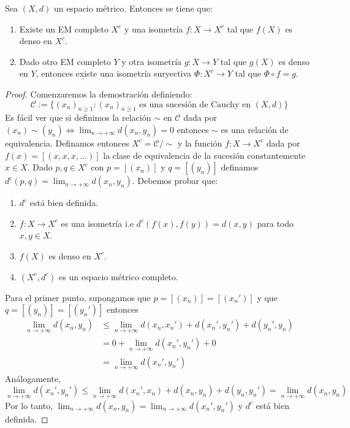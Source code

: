 \documentclass{article}
\theoremstyle{plain}
\theoremstyle{definition}
\newenvironment{ejercicio}[1]{\begin{trivlist}
\item[\hskip \labelsep {\bfseries Ejercicio}\hskip \labelsep {\bfseries #1.}]}{\end{trivlist}}
\begin{document}
\begin{ejercicio}{8}
    Sea \( (X, d) \) un espacio métrico. Entonces se tiene que:
    \begin{enumerate}
        \item Existe un EM completo \( X^c \) y una isometría \( f : X \to X^c \) tal que \( f(X) \) es denso en \( X^c \).
        \item Dado otro EM completo \( Y \) y otra isometría \( g : X \to Y \) tal que \( g(X) \) es denso en \( Y \), entonces existe una isometría suryectiva \( \Phi : X^c \to Y \) tal que \( \Phi \circ f = g \).
    \end{enumerate}
\end{ejercicio}
\begin{proof}
    Comenzaremos la demostración definiendo: \[
        \mathcal{C} := \{ {(x_n)}_{n \geq 1} : {(x_n)}_{n \geq 1} \text{ es una sucesión de Cauchy en } (X, d) \}
    \]
    Es fácil ver que si definimos la relación \( \sim \) en \( \mathcal{C} \) dada por \( {(x_n)} \sim {(y_n)} \iff \lim_{n \to +\infty} d(x_n, y_n) = 0 \) entonces \( \sim \) es una relación de equivalencia.
    Definamos entonces \( X^c = \mathcal{C} / \sim \) y la función \( f : X \to X^c \) dada por \( f(x) = [(x, x, x, \ldots)] \) la clase de equivalencia de la sucesión constantemente \( x \in X \).
    Dado \( p, q \in X^c \) con \( p = [(x_n)] \) y \( q = [(y_n)] \) definamos \( d^c(p, q) = \lim_{n \to +\infty} d(x_n, y_n) \). Debemos probar que: \begin{enumerate}
        \item \( d^c \) está bien definida.
        \item \( f : X \to X^c \) es una isometría i.e \( d^c(f(x), f(y)) = d(x, y) \) para todo \( x, y \in X \).
        \item \( f(X) \) es denso en \( X^c \).
        \item \( (X^c, d^c) \) es un espacio métrico completo.
    \end{enumerate}
    Para el primer punto, supongamos que \( p = [(x_n)] = [(x_n')] \) y que \( q = [(y_n)] = [(y_n')] \) entonces \begin{align*}
        \lim_{n \to +\infty} d(x_n, y_n) & \leq \lim_{n \to +\infty} d(x_n, x_n') + d(x_n', y_n') + d(y_n', y_n) \\
                                         & = 0 + \lim_{n \to +\infty} d(x_n', y_n') + 0                          \\
                                         & = \lim_{n \to +\infty} d(x_n', y_n')
    \end{align*}
    Análogamente, \[
        \lim_{n \to +\infty} d(x_n', y_n') \leq \lim_{n \to +\infty} d(x_n', x_n) + d(x_n, y_n) + d(y_n, y_n') = \lim_{n \to +\infty} d(x_n, y_n)
    \]
    Por lo tanto, \( \lim_{n \to +\infty} d(x_n, y_n) = \lim_{n \to +\infty} d(x_n', y_n') \) y \( d^c \) está bien definida.


\end{proof}
\end{document}
